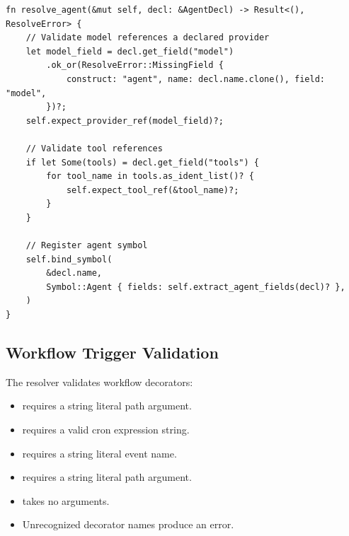 \begin{lstlisting}[language={}]
fn resolve_agent(&mut self, decl: &AgentDecl) -> Result<(), ResolveError> {
    // Validate model references a declared provider
    let model_field = decl.get_field("model")
        .ok_or(ResolveError::MissingField {
            construct: "agent", name: decl.name.clone(), field: "model",
        })?;
    self.expect_provider_ref(model_field)?;

    // Validate tool references
    if let Some(tools) = decl.get_field("tools") {
        for tool_name in tools.as_ident_list()? {
            self.expect_tool_ref(&tool_name)?;
        }
    }

    // Register agent symbol
    self.bind_symbol(
        &decl.name,
        Symbol::Agent { fields: self.extract_agent_fields(decl)? },
    )
}
\end{lstlisting}

\subsection{Workflow Trigger Validation}

The resolver validates workflow decorators:

\begin{itemize}
    \item {} requires a string literal path argument.
    \item {} requires a valid cron expression string.
    \item {} requires a string literal event name.
    \item {} requires a string literal path argument.
    \item {} takes no arguments.
    \item Unrecognized decorator names produce an error.
\end{itemize}

